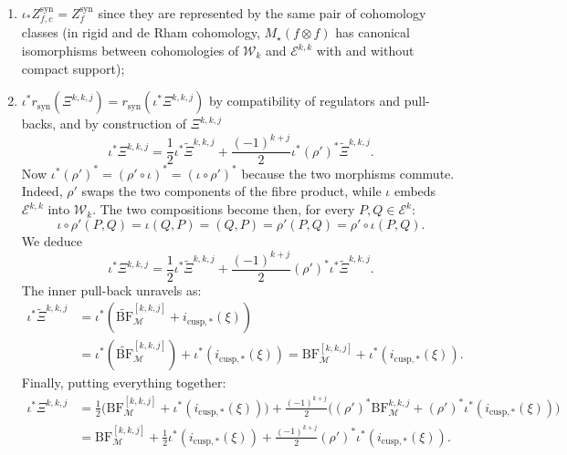 \documentclass[10pt,a4paper]{amsart}
\newcommand{\BF}{\mathrm{BF}}
\newcommand{\Ell}{\mathcal{E}}
\newcommand{\KS}{\mathscr{W}}
\newcommand{\cBF}{\Xi}
\newcommand{\lcBF}{\widetilde{\Xi}}
\newcommand{\regulator}[1]{r_{#1}}
\newcommand{\rsyn}{\regulator{\syn}}
\DeclareMathOperator{\syn}{syn}
\newcommand{\lBF}{\widetilde{\mathrm{BF}}}
\DeclareMathOperator{\mot}{\mathscr{M}}
\begin{document}
   \begin{enumerate}
       \item $\iota_* Z_{f,c}^{\syn} = Z_f^{\syn}$ since they are represented by the same pair of cohomology classes (in rigid and de Rham cohomology, $M_{\star}(f\otimes f)$ has canonical isomorphisms between cohomologies of $\KS_k$ and $\Ell^{k,k}$ with and without compact support);
       \item $\iota^*\rsyn(\cBF^{k,k,j}) = \rsyn(\iota^*\cBF^{k,k,j})$ by compatibility of regulators and pull-backs, and by construction of $\cBF^{k,k,j}$
           \[
               \iota^*\cBF^{k,k,j} = \frac{1}{2}\iota^*\lcBF^{k,k,j} + \frac{(-1)^{k+j}}{2}\iota^*(\rho')^*\lcBF^{k,k,j}.
           \]
           Now $\iota^*(\rho')^* = (\rho'\circ \iota)^* = (\iota\circ \rho')^*$ because the two morphisms commute. Indeed, $\rho'$ swaps the two components of the fibre product, while $\iota$ embeds $\Ell^{k,k}$ into $\KS_k$. The two compositions become then, for every $P,Q\in\Ell^k$:
           \[
            \iota\circ\rho'(P,Q) = \iota(Q,P) = (Q,P) = \rho'(P,Q) = \rho'\circ \iota(P,Q).
           \]
           We deduce
           \[
               \iota^*\cBF^{k,k,j} = \frac{1}{2}\iota^*\lcBF^{k,k,j} + \frac{(-1)^{k+j}}{2}(\rho')^*\iota^*\lcBF^{k,k,j}.
           \]
           The inner pull-back unravels as:
           \begin{equation}
               \label{eq:pull-back-lcbf}
               \begin{split}
                   \iota^* \lcBF^{k,k,j} &= \iota^*(\lBF^{[k,k,j]}_{\mot} + i_{\mathrm{cusp},*}(\xi)) \\
                   &= \iota^*(\lBF^{[k,k,j]}_{\mot}) + \iota^*(i_{\mathrm{cusp},*}(\xi)) = \BF^{[k,k,j]}_{\mot} + \iota^*(i_{\mathrm{cusp},*}(\xi)).
               \end{split}
           \end{equation}
           Finally, putting everything together:
           \begin{equation}
               \label{eq:pull-back-cbf}
               \begin{split}
                   \iota^* \cBF^{k,k,j} &= \frac{1}{2}\bigl(\BF^{[k,k,j]}_{\mot} + \iota^*(i_{\mathrm{cusp},*}(\xi))\bigr) + \frac{(-1)^{k+j}}{2}\bigl((\rho')^*\BF^{k,k,j}_{\mot} + (\rho')^*\iota^*(i_{\mathrm{cusp},*}(\xi))\bigr) \\
                   &= \BF^{[k,k,j]}_{\mot} + \frac{1}{2}\iota^*(i_{\mathrm{cusp},*}(\xi)) + \frac{(-1)^{k+j}}{2}(\rho')^*\iota^*(i_{\mathrm{cusp},*}(\xi)).
               \end{split}
           \end{equation}
   \end{enumerate}
\end{document}
